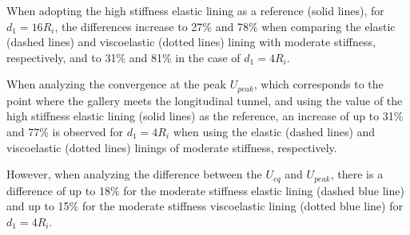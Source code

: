 \documentclass[a4paper,fleqn]{cas-sc}
\begin{document}
When adopting the high stiffness elastic lining as a reference (solid lines), for $d_1 = 16R_i$, the differences increase to 27\% and 78\% when comparing the elastic (dashed lines) and viscoelastic (dotted lines) lining with moderate stiffness, respectively, and to 31\% and 81\% in the case of $d_1=4R_i$.

When analyzing the convergence at the peak $U_{peak}$, which corresponds to the point where the gallery meets the longitudinal tunnel, and using the value of the high stiffness elastic lining (solid lines) as the reference, an increase of up to 31\% and 77\% is observed for $d_1=4R_i$ when using the elastic (dashed lines) and viscoelastic (dotted lines) linings of moderate stiffness, respectively.

However, when analyzing the difference between the $U_{eq}$ and $U_{peak}$, there is a difference of up to 18\% for the moderate stiffness elastic lining (dashed blue line) and up to 15\% for the moderate stiffness viscoelastic lining (dotted blue line) for $d_1=4R_i$.
\end{document}

